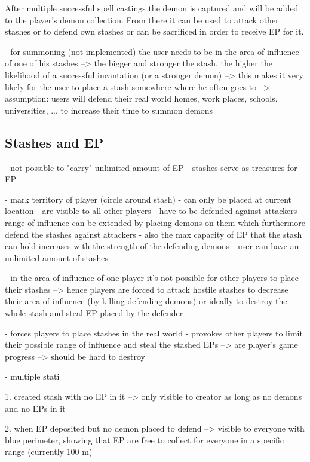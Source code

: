 After multiple successful spell castings the demon is captured and will be added to the player's demon collection. 
From there it can be used to attack other stashes or to defend own stashes or can be sacrificed in order to receive EP for it.

- for summoning (not implemented) the user needs to be in the area of influence of one of his stashes --> the bigger and stronger the stash, the higher the likelihood of a successful incantation (or a stronger demon)
--> this makes it very likely for the user to place a stash somewhere where he often goes to 
--> assumption: users will defend their real world homes, work places, schools, universities, ... to increase their time to summon demons

\subsection{Stashes and EP}
\label{subsec:stashesandep}

- not possible to "carry" unlimited amount of EP 
- stashes serve as treasures for EP

- mark territory of player (circle around stash)
- can only be placed at current location
- are visible to all other players 
- have to be defended against attackers
- range of influence can be extended by placing demons on them which furthermore defend the stashes against attackers 
- also the max capacity of EP that the stash can hold increases with the strength of the defending demons
- user can have an unlimited amount of stashes

- in the area of influence of one player it's not possible for other players to place their stashes --> hence players are forced to attack hostile stashes to decrease their area of influence (by killing defending demons) or ideally to destroy the whole stash and steal EP placed by the defender

- forces players to place stashes in the real world 
- provokes other players to limit their possible range of influence and steal the stashed EPs
--> are player's game progress
--> should be hard to destroy

- multiple stati

1. created stash with no EP in it --> only visible to creator as long as no demons and no EPs in it

2. when EP deposited but no demon placed to defend --> visible to everyone with blue perimeter, showing that EP are free to collect for everyone in a specific range (currently 100 m)

